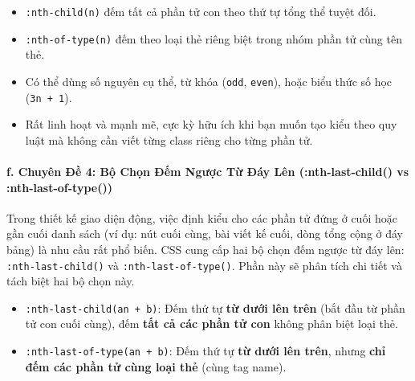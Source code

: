\documentclass[11pt,oneside]{book}
\newcommand{\codeinline}[1]{\textcolor{accentOrange}{\texttt{#1}}}
\begin{document}
\begin{conceptBox}
\begin{itemize}[leftmargin=1.5em, itemsep=2pt, parsep=0pt]
    \item \codeinline{:nth-child(n)} đếm tất cả phần tử con theo thứ tự tổng thể tuyệt đối.
    \item \codeinline{:nth-of-type(n)} đếm theo loại thẻ riêng biệt trong nhóm phần tử cùng tên thẻ.
    \item Có thể dùng số nguyên cụ thể, từ khóa (\codeinline{odd}, \codeinline{even}), hoặc biểu thức số học (\codeinline{3n + 1}).
    \item Rất linh hoạt và mạnh mẽ, cực kỳ hữu ích khi bạn muốn tạo kiểu theo quy luật mà không cần viết từng class riêng cho từng phần tử.
\end{itemize}
\end{conceptBox}

\paragraph{f. Chuyên Đề 4: Bộ Chọn Đếm Ngược Từ Đáy Lên (:nth-last-child() vs :nth-last-of-type())}

Trong thiết kế giao diện động, việc định kiểu cho các phần tử đứng ở cuối hoặc gần cuối danh sách (ví dụ: nút cuối cùng, bài viết kế cuối, dòng tổng cộng ở đáy bảng) là nhu cầu rất phổ biến. CSS cung cấp hai bộ chọn đếm ngược từ đáy lên: \codeinline{:nth-last-child()} và \codeinline{:nth-last-of-type()}. Phần này sẽ phân tích chi tiết và tách biệt hai bộ chọn này.

\begin{conceptBox}
\begin{itemize}[leftmargin=1.5em, itemsep=3pt, parsep=0pt]
    \item \codeinline{:nth-last-child(an + b)}: Đếm thứ tự \textbf{từ dưới lên trên} (bắt đầu từ phần tử con cuối cùng), đếm \textbf{tất cả các phần tử con} không phân biệt loại thẻ.
    \item \codeinline{:nth-last-of-type(an + b)}: Đếm thứ tự \textbf{từ dưới lên trên}, nhưng \textbf{chỉ đếm các phần tử cùng loại thẻ} (cùng tag name).
\end{itemize}
\end{conceptBox}

\end{document}
